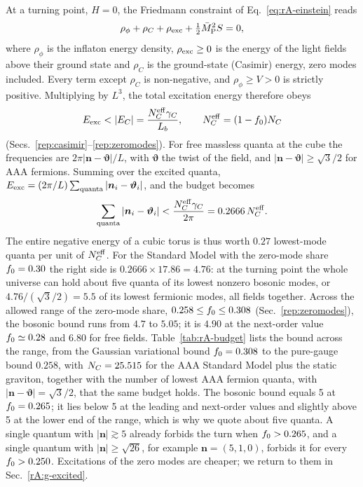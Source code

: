 At a turning point, $H=0$, the Friedmann constraint of Eq.~\eqref{eq:rA-einstein} reads
\begin{equation}
\rho_\phi+\rho_C+\rho_{\rm exc}+\tfrac12\bar M_{\mathrm{P}}^2S=0,
\label{eq:rA-g-constraint}
\end{equation}
where $\rho_\phi$ is the inflaton energy density, $\rho_{\rm exc}\geq0$ is the energy of the light fields above their ground state and $\rho_C$ is the ground-state (Casimir) energy, zero modes included.
Every term except $\rho_C$ is non-negative, and $\rho_\phi\geq V>0$ is strictly positive.
Multiplying by $L^3$, the total excitation energy therefore obeys
\begin{equation}
E_{\rm exc}<|E_C|=\frac{\rANeff\rAgam}{\Lb},\qquad \rANeff=(1-\fzm)\NC
\end{equation}
(Secs.~\ref{rep:casimir}--\ref{rep:zeromodes}).
For free massless quanta at the cube the frequencies are $2\pi|\bm n-\bm\vartheta|/L$, with $\bm\vartheta$ the twist of the field, and $|\bm n-\bm\vartheta|\geq\sqrt3/2$ for AAA fermions.
Summing over the excited quanta, $E_{\rm exc}=(2\pi/L)\sum_{\rm quanta}|\bm n_i-\bm\vartheta_i|$, and the budget becomes
\begin{equation}
\sum_{\rm quanta}|\bm n_i-\bm\vartheta_i|<\frac{N_C^{\mathrm{eff}}\gamma_C}{2\pi}=0.2666\,N_C^{\mathrm{eff}} .
\label{eq:rA-emptiness}
\end{equation} %
The entire negative energy of a cubic torus is thus worth $0.27$ lowest-mode quanta per unit of $N_C^{\mathrm{eff}}$. %
For the Standard Model with the zero-mode share $f_0=0.30$ the right side is $0.2666\times17.86=4.76$: %
at the turning point the whole universe can hold about five quanta of its lowest nonzero bosonic modes, or $4.76/(\sqrt3/2)=5.5$ of its lowest fermionic modes, all fields together. %
Across the allowed range of the zero-mode share, $0.258\leq f_0\leq0.308$ (Sec.~\ref{rep:zeromodes}), the bosonic bound runs from $4.7$ to $5.05$; it is $4.90$ at the next-order value $f_0\simeq0.28$ and $6.80$ for free fields. %
Table~\ref{tab:rA-budget} lists the bound across the range, from the Gaussian variational bound $f_0=0.308$ to the pure-gauge bound $0.258$, with $N_C=25.515$ for the AAA Standard Model plus the static graviton, together with the number of lowest AAA fermion quanta, with $|\bm n-\bm\vartheta|=\sqrt3/2$, that the same budget holds. %
The bosonic bound equals 5 at $f_0=0.265$; it lies below 5 at the leading and next-order values and slightly above 5 at the lower end of the range, which is why we quote about five quanta. %
A single quantum with $|\bm n|\gtrsim5$ already forbids the turn when $f_0>0.265$, and a single quantum with $|\bm n|\geq\sqrt{26}$, for example $\bm n=(5,1,0)$, forbids it for every $f_0>0.250$. %
Excitations of the zero modes are cheaper; we return to them in Sec.~\ref{rA:g-excited}.

